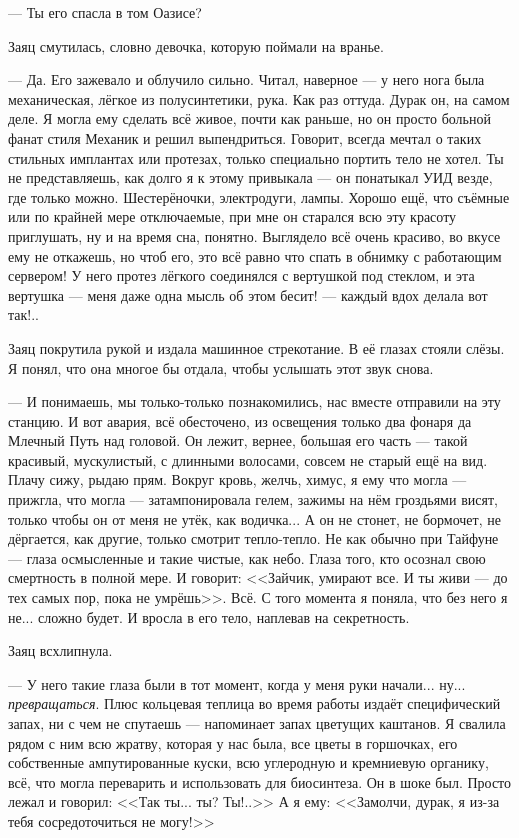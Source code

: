 --- Ты его спасла в том Оазисе?

Заяц смутилась, словно девочка, которую поймали на вранье.

--- Да.
Его зажевало и облучило сильно.
Читал, наверное --- у него нога была механическая, лёгкое из полусинтетики, рука.
Как раз оттуда.
Дурак он, на самом деле.
Я могла ему сделать всё живое, почти как раньше, но он просто больной фанат стиля Механик и решил выпендриться.
Говорит, всегда мечтал о таких стильных имплантах или протезах, только специально портить тело не хотел.
Ты не представляешь, как долго я к этому привыкала --- он понатыкал УИД везде, где только можно.
Шестерёночки, электродуги, лампы.
Хорошо ещё, что съёмные или по крайней мере отключаемые, при мне он старался всю эту красоту приглушать, ну и на время сна, понятно.
Выглядело всё очень красиво, во вкусе ему не откажешь, но чтоб его, это всё равно что спать в обнимку с работающим сервером!
У него протез лёгкого соединялся с вертушкой под стеклом, и эта вертушка --- меня даже одна мысль об этом бесит! --- каждый вдох делала вот так!..

Заяц покрутила рукой и издала машинное стрекотание.
В её глазах стояли слёзы.
Я понял, что она многое бы отдала, чтобы услышать этот звук снова.

--- И понимаешь, мы только-только познакомились, нас вместе отправили на эту станцию.
И вот авария, всё обесточено, из освещения только два фонаря да Млечный Путь над головой.
Он лежит, вернее, большая его часть --- такой красивый, мускулистый, с длинными волосами, совсем не старый ещё на вид.
Плачу сижу, рыдаю прям.
Вокруг кровь, желчь, химус, я ему что могла --- прижгла, что могла --- затампонировала гелем, зажимы на нём гроздьями висят, только чтобы он от меня не утёк, как водичка...
А он не стонет, не бормочет, не дёргается, как другие, только смотрит тепло-тепло.
Не как обычно при Тайфуне --- глаза осмысленные и такие чистые, как небо.
Глаза того, кто осознал свою смертность в полной мере.
И говорит: <<Зайчик, умирают все.
И ты живи --- до тех самых пор, пока не умрёшь>>.
Всё.
С того момента я поняла, что без него я не... сложно будет.
И вросла в его тело, наплевав на секретность.

Заяц всхлипнула.

--- У него такие глаза были в тот момент, когда у меня руки начали... ну... \emph{превращаться}.
Плюс кольцевая теплица во время работы издаёт специфический запах, ни с чем не спутаешь --- напоминает запах цветущих каштанов.
Я свалила рядом с ним всю жратву, которая у нас была, все цветы в горшочках, его собственные ампутированные куски, всю углеродную и кремниевую органику, всё, что могла переварить и использовать для биосинтеза. %
Он в шоке был.
Просто лежал и говорил: <<Так ты... ты? Ты!..>>
А я ему: <<Замолчи, дурак, я из-за тебя сосредоточиться не могу!>>


